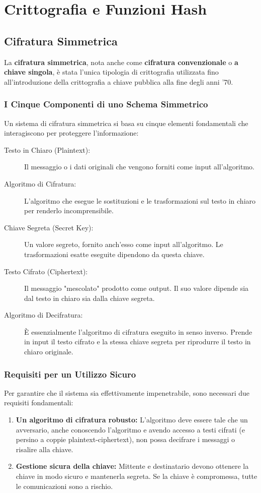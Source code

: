 \chapter{Crittografia e Funzioni Hash}

\section{Cifratura Simmetrica}
La \textbf{cifratura simmetrica}, nota anche come \textbf{cifratura convenzionale} o \textbf{a chiave singola}, è stata l'unica tipologia di crittografia utilizzata fino all'introduzione della crittografia a chiave pubblica alla fine degli anni '70.

\subsection{I Cinque Componenti di uno Schema Simmetrico}
Un sistema di cifratura simmetrica si basa su cinque elementi fondamentali che interagiscono per proteggere l'informazione:

\begin{description}
    \item[Testo in Chiaro (Plaintext):] Il messaggio o i dati originali che vengono forniti come input all'algoritmo.
    \item[Algoritmo di Cifratura:] L'algoritmo che esegue le sostituzioni e le trasformazioni sul testo in chiaro per renderlo incomprensibile.
    \item[Chiave Segreta (Secret Key):] Un valore segreto, fornito anch'esso come input all'algoritmo. Le trasformazioni esatte eseguite dipendono da questa chiave.
    \item[Testo Cifrato (Ciphertext):] Il messaggio "mescolato" prodotto come output. Il suo valore dipende sia dal testo in chiaro sia dalla chiave segreta.
    \item[Algoritmo di Decifratura:] È essenzialmente l'algoritmo di cifratura eseguito in senso inverso. Prende in input il testo cifrato e la stessa chiave segreta per riprodurre il testo in chiaro originale.
\end{description}

\subsection{Requisiti per un Utilizzo Sicuro}
Per garantire che il sistema sia effettivamente impenetrabile, sono necessari due requisiti fondamentali:
\begin{enumerate}
    \item \textbf{Un algoritmo di cifratura robusto:} L'algoritmo deve essere tale che un avversario, anche conoscendo l'algoritmo e avendo accesso a testi cifrati (e persino a coppie plaintext-ciphertext), non possa decifrare i messaggi o risalire alla chiave.
    \item \textbf{Gestione sicura della chiave:} Mittente e destinatario devono ottenere la chiave in modo sicuro e mantenerla segreta. Se la chiave è compromessa, tutte le comunicazioni sono a rischio.
\end{enumerate}

